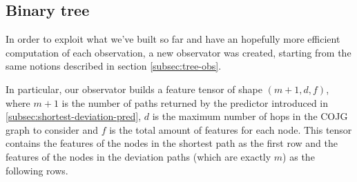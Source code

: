 \documentclass[a4paper,10pt]{report}
\begin{document}
\subsection{Binary tree}\label{subsec:binary-tree-obs}
In order to exploit what we've built so far and have an hopefully more efficient computation of each observation, a new observator was created, starting from the same notions described in section \ref{subsec:tree-obs}. 

In particular, our observator builds a feature tensor of shape $(m + 1, d, f)$, where $m+1$ is the number of paths returned by the predictor introduced in \ref{subsec:shortest-deviation-pred}, $d$ is the maximum number of hops in the COJG graph to consider and $f$ is the total amount of features for each node. This tensor contains the features of the nodes in the shortest path as the first row and the features of the nodes in the deviation paths (which are exactly $m$) as the following rows.
\end{document}
